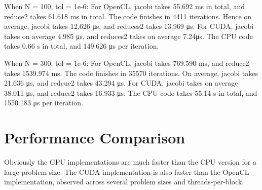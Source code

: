 \documentclass{amsart} %
\begin{document}
When N = 100, tol = 1e-6:
For OpenCL, jacobi takes 55.692 ms in total, and reduce2 takes 61.618 ms in total. The code finishes in 4411 iterations. Hence on average, jacobi takes 12.626 μs, and reduces2 takes 13.969 μs. For CUDA, jacobi takes on average 4.985 μs, and reduces2 takes on average 7.24μs. The CPU code takes 0.66 s in total, and 149.626 μs per iteration. 

When N = 300, tol = 1e-6:
For OpenCL, jacobi takes 769.590 ms, and reduce2 takes 1539.974 ms. The code finishes in 35570 iterations. On average, jacobi takes 21.636 μs, and redcue2 takes 43.294 μs. For CUDA, jacobi takes on average 38.011 μs, and reduce2 takes 16.933 μs. The CPU code takes 55.14 s in total, and 1550.183 μs per iteration. 

\section{Performance Comparison}
Obviously the GPU implementations are much faster than the CPU version for a large problem size. The CUDA implementation is also faster than the OpenCL implementation, observed across several problem sizes and threads-per-block.         

 




 

\end{document}
